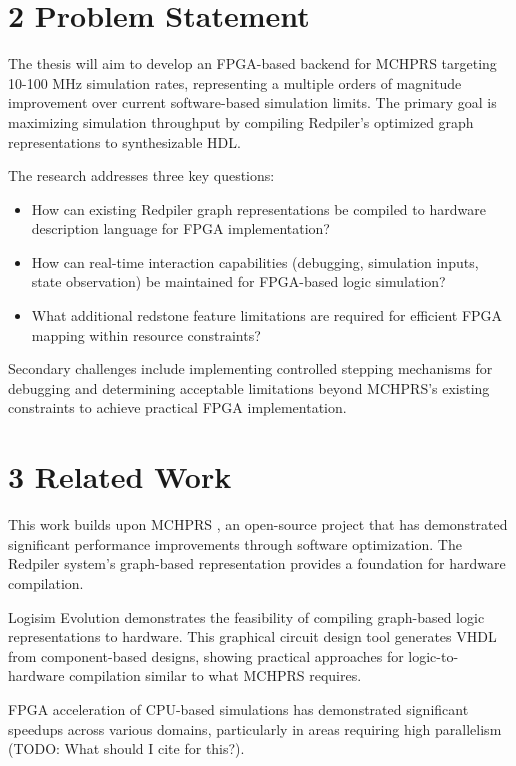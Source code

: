 \documentclass[a4paper,11pt]{article}
\begin{document}
\section*{2 Problem Statement}

The thesis will aim to develop an FPGA-based backend for MCHPRS targeting 10-100 MHz simulation rates, representing a multiple orders of magnitude improvement over current software-based simulation limits.
The primary goal is maximizing simulation throughput by compiling Redpiler's optimized graph representations to synthesizable HDL.

The research addresses three key questions:
\begin{itemize}[parsep=0.5em]
    \item How can existing Redpiler graph representations be compiled to hardware description language for FPGA implementation?
    \item How can real-time interaction capabilities (debugging, simulation inputs, state observation) be maintained for FPGA-based logic simulation?
    \item What additional redstone feature limitations are required for efficient FPGA mapping within resource constraints?
\end{itemize}

Secondary challenges include implementing controlled stepping mechanisms for debugging and determining acceptable limitations beyond MCHPRS's existing constraints to achieve practical FPGA implementation.

\section*{3 Related Work}

This work builds upon MCHPRS \cite{mchprs}, an open-source project that has demonstrated significant performance improvements through software optimization.
The Redpiler system's graph-based representation provides a foundation for hardware compilation.

Logisim Evolution \cite{logisimevolution} demonstrates the feasibility of compiling graph-based logic representations to hardware.
This graphical circuit design tool generates VHDL from component-based designs, showing practical approaches for logic-to-hardware compilation similar to what MCHPRS requires.

FPGA acceleration of CPU-based simulations has demonstrated significant speedups across various domains, particularly in areas requiring high parallelism (TODO: What should I cite for this?).
\end{document}
